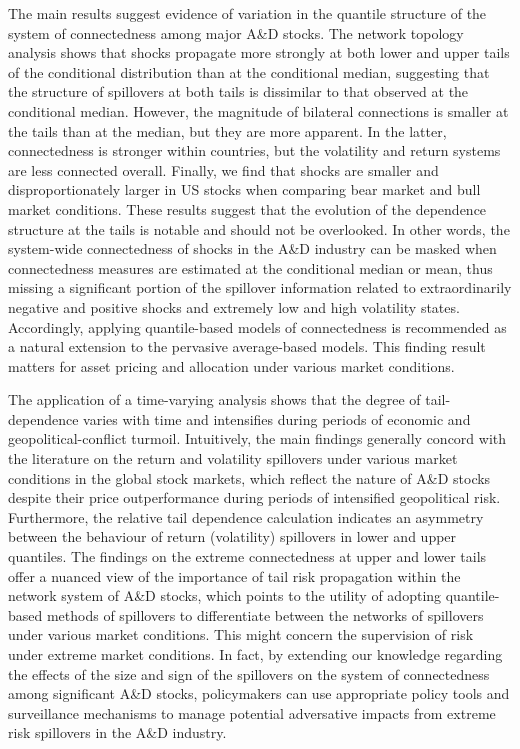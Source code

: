 \documentclass[
  letterpaper,
  DIV=11,
  numbers=noendperiod]{scrartcl}
\begin{document}
The main results suggest evidence of variation in the quantile structure
of the system of connectedness among major A\&D stocks. The network
topology analysis shows that shocks propagate more strongly at both
lower and upper tails of the conditional distribution than at the
conditional median, suggesting that the structure of spillovers at both
tails is dissimilar to that observed at the conditional median. However,
the magnitude of bilateral connections is smaller at the tails than at
the median, but they are more apparent. In the latter, connectedness is
stronger within countries, but the volatility and return systems are
less connected overall. Finally, we find that shocks are smaller and
disproportionately larger in US stocks when comparing bear market and
bull market conditions. These results suggest that the evolution of the
dependence structure at the tails is notable and should not be
overlooked. In other words, the system-wide connectedness of shocks in
the A\&D industry can be masked when connectedness measures are
estimated at the conditional median or mean, thus missing a significant
portion of the spillover information related to extraordinarily negative
and positive shocks and extremely low and high volatility states.
Accordingly, applying quantile-based models of connectedness is
recommended as a natural extension to the pervasive average-based
models. This finding result matters for asset pricing and allocation
under various market conditions.

The application of a time-varying analysis shows that the degree of
tail-dependence varies with time and intensifies during periods of
economic and geopolitical-conflict turmoil. Intuitively, the main
findings generally concord with the literature on the return and
volatility spillovers under various market conditions in the global
stock markets, which reflect the nature of A\&D stocks despite their
price outperformance during periods of intensified geopolitical risk.
Furthermore, the relative tail dependence calculation indicates an
asymmetry between the behaviour of return (volatility) spillovers in
lower and upper quantiles. The findings on the extreme connectedness at
upper and lower tails offer a nuanced view of the importance of tail
risk propagation within the network system of A\&D stocks, which points
to the utility of adopting quantile-based methods of spillovers to
differentiate between the networks of spillovers under various market
conditions. This might concern the supervision of risk under extreme
market conditions. In fact, by extending our knowledge regarding the
effects of the size and sign of the spillovers on the system of
connectedness among significant A\&D stocks, policymakers can use
appropriate policy tools and surveillance mechanisms to manage potential
adversative impacts from extreme risk spillovers in the A\&D industry.
\end{document}
